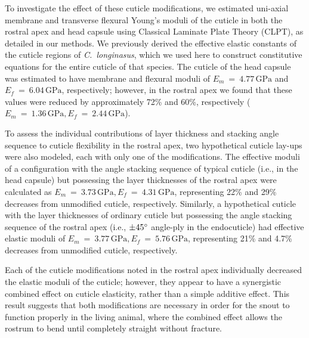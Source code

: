 \documentclass[twocolumn, linenumbers, superscriptaddress, nofootinbib]{revtex4-1}
\begin{document}
		To investigate the effect of these cuticle modifications, we estimated uni-axial membrane and transverse flexural Young's moduli of the cuticle in both the rostral apex and head capsule using Classical Laminate Plate Theory (CLPT), as detailed in our methods.
		We previously derived the effective elastic constants of the cuticle regions of \textit{C.~longinasus}, which we used here to construct constitutive equations for the entire cuticle of that species.
		The cuticle of the head capsule was estimated to have membrane and flexural moduli of $E_m~=~4.77\,\text{GPa}$ and $E_f~=~6.04\,\text{GPa}$, respectively; however, in the rostral apex we found that these values were reduced by approximately 72\% and 60\%, respectively ($E_m~=~1.36\,\text{GPa}, E_f~=~2.44\,\text{GPa}$).
		
		To assess the individual contributions of layer thickness and stacking angle sequence to cuticle flexibility in the rostral apex, two hypothetical cuticle lay-ups were also modeled, each with only one of the modifications.
		The effective moduli of a configuration with the angle stacking sequence of typical cuticle (i.e., in the head capsule) but possessing the layer thicknesses of the rostral apex were calculated as $E_m~=~3.73\,\text{GPa}, E_f~=~4.31\,\text{GPa}$, representing 22\% and 29\% decreases from unmodified cuticle, respectively.
		Similarly, a hypothetical cuticle with the layer thicknesses of ordinary cuticle but possessing the angle stacking sequence of the rostral apex (i.e., $\pm45\degree$ angle-ply in the endocuticle) had effective elastic moduli of $E_m~=~3.77\,\text{GPa}, E_f~=~5.76\,\text{GPa}$, representing 21\% and 4.7\% decreases from unmodified cuticle, respectively.
		
		
		Each of the cuticle modifications noted in the rostral apex individually decreased the elastic moduli of the cuticle; however, they appear to have a synergistic combined effect on cuticle elasticity, rather than a simple additive effect.
		This result suggests that both modifications are necessary in order for the snout to function properly in the living animal, where the combined effect allows the rostrum to bend until completely straight without fracture.
		
\end{document}

